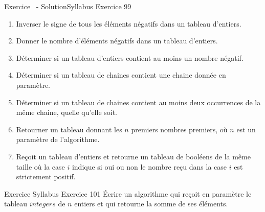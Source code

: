 \begin{frame}[allowframebreaks]{Exercice \theexercice~- Solution}{Syllabus Exercice 99}
    \begin{enumerate}
        \item
        Inverser le signe de tous les éléments négatifs dans un tableau d’entiers.
        
        \item
        Donner le nombre d’éléments négatifs dans un tableau d’entiers.
        
        \item
        Déterminer si un tableau d’entiers contient au moins un nombre négatif.
        
        \item
        Déterminer si un tableau de chaines contient
        une chaine donnée en paramètre.
        
        \item
        Déterminer si un tableau de chaines contient
        au moins deux occurrences de la même chaine,
        quelle qu’elle soit.
        
        \item
        Retourner un tableau donnant les $n$ premiers nombres premiers,
        où $n$ est un paramètre de l’algorithme.
        
        \item
        Reçoit un tableau d’entiers
        et retourne un tableau de booléens de la même taille
        où la case $i$ indique si oui ou non
        le nombre reçu dans la case $i$ est strictement positif.
        
    \end{enumerate}

\end{frame}

\begin{frame}{Exercice \theexercice}{Syllabus Exercice 101}
    Écrire un algorithme qui reçoit en paramètre le tableau $integers$
    de $n$ entiers et qui retourne la somme de ses éléments.
\end{frame}

